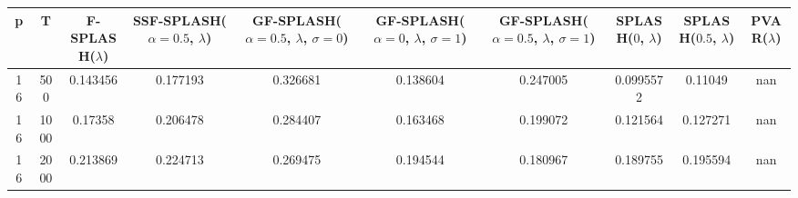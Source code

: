 \begin{tabular}{cccccccccc}
\hline
  p  &  T   &  F-SPLASH($\lambda$)  &  SSF-SPLASH($\alpha=0.5$, $\lambda$)  &  GF-SPLASH($\alpha=0.5$, $\lambda$, $\sigma=0$)  &  GF-SPLASH($\alpha=0$, $\lambda$, $\sigma=1$)  &  GF-SPLASH($\alpha=0.5$, $\lambda$, $\sigma=1$)  &  SPLASH($0$, $\lambda$)  &  SPLASH($0.5$, $\lambda$)  &  PVAR($\lambda$)  \\
\hline
 16  & 500  &       0.143456        &               0.177193                &                     0.326681                     &                    0.138604                    &                     0.247005                     &        0.0995572         &          0.11049           &        nan        \\
 16  & 1000 &        0.17358        &               0.206478                &                     0.284407                     &                    0.163468                    &                     0.199072                     &         0.121564         &          0.127271          &        nan        \\
 16  & 2000 &       0.213869        &               0.224713                &                     0.269475                     &                    0.194544                    &                     0.180967                     &         0.189755         &          0.195594          &        nan        \\
\hline
\end{tabular}